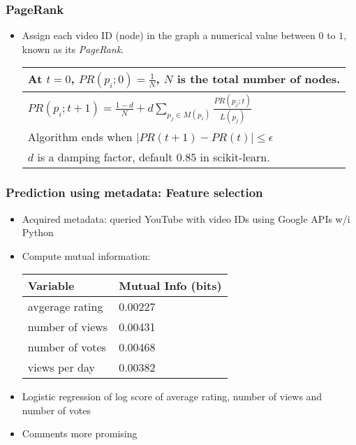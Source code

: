\documentclass[fleqn]{beamer}
\begin{document}
\begin{frame}
\frametitle{PageRank}
      \begin{itemize}
         \item Assign each video ID (node) in the graph a numerical value
         between $0$ to $1$, known as its \textsl{PageRank}.
         \begin{center}
         \begin{tabular}{| l |}
         \hline
         At $t=0$, $PR(p_{i};0) = \frac{1}{N}$, $N$ is the total number of nodes. \\ \hline
         $PR(p_{i};t+1) = \frac{1-d}{N} + d \sum_{p_{j} \in M(p_{i})} \frac{PR(p_{j};t)}{L(p_{j})}$ \\ \hline
         Algorithm ends when $|PR(t+1) - PR(t)| \le \epsilon$ \\ \hline
         $d$ is a damping factor, default $0.85$ in scikit-learn. \\
         \hline
         \end{tabular}
         \end{center}
     \end{itemize}

\end{frame}

\begin{frame}
\frametitle{Prediction using metadata: Feature selection}
      \begin{itemize}
      	\item Acquired metadata: queried YouTube with video IDs using Google APIs w/i Python
          \item Compute mutual information: \\
          		\begin{center}
        			\begin{tabular}{ | l | l |}
			\hline
			Variable & Mutual Info (bits) \\ \hline
			avgerage rating & 0.00227\\ \hline
			number of views & 0.00431\\ \hline
			number of votes & 0.00468\\ \hline
			views per day & 0.00382 \\
			\hline
			\end{tabular}
					
      		\end{center}	
          \item Logistic regression of log score of average rating, number of views and number of votes
          \item Comments more promising
      \end{itemize}

\end{frame}
\end{document}

